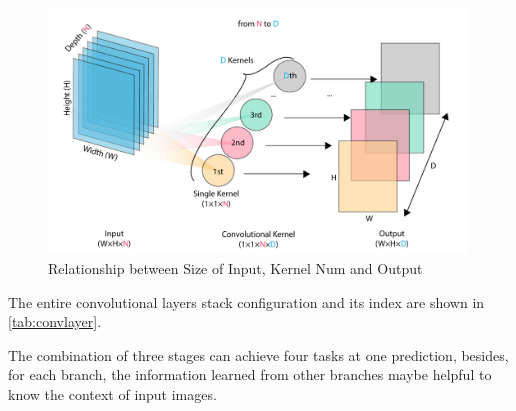 \begin{spacing}{1.5}
\begin{figure}[ht]
\centering
\includegraphics[width=0.99\textwidth, fbox]{Chapter3/oneonekernel.pdf}
\caption{Relationship between Size of Input, Kernel Num and Output}
\label{fig:oneonekernel} 
\end{figure}

The entire convolutional layers stack configuration and its index are shown in \autoref{tab:convlayer}.

\begin{table}[ht]
\centering
\caption{Convolutional Layers and Pooling Configuration}
\label{tab:convlayer}
\end{table}

The combination of three stages can achieve four tasks at one prediction, besides, for each branch, the information learned from other branches maybe helpful to know the context of input images.


\end{spacing}
